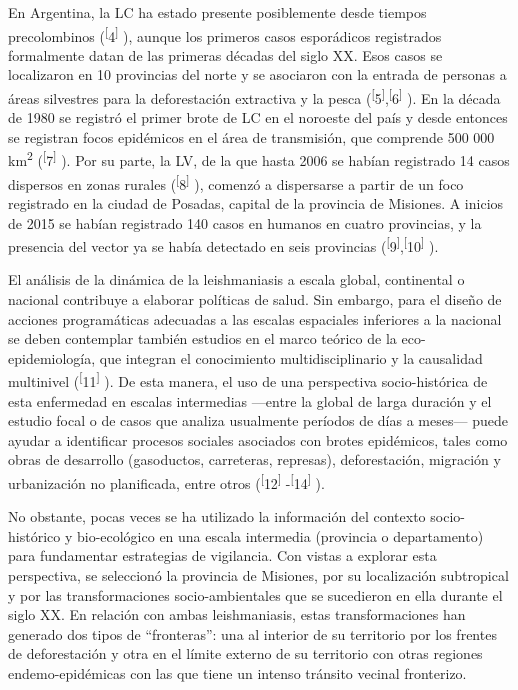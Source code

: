 \documentclass{article}
\begin{document}
En Argentina, la LC ha estado presente posiblemente desde tiempos precolombinos
(\textsuperscript{[}4\textsuperscript{]}
), aunque los primeros casos esporádicos registrados formalmente datan de las
primeras décadas del siglo XX. Esos casos se localizaron en 10 provincias del
norte y se asociaron con la entrada de personas a áreas silvestres para la
deforestación extractiva y la pesca (\textsuperscript{[}5\textsuperscript{]},\textsuperscript{[}6\textsuperscript{]}
). En la década de 1980 se registró el primer brote de LC en el noroeste del
país y desde entonces se registran focos epidémicos en el área de transmisión,
que comprende 500 000 km\textsuperscript{2}
(\textsuperscript{[}7\textsuperscript{]}
). Por su parte, la LV, de la que hasta 2006 se habían registrado 14 casos
dispersos en zonas rurales (\textsuperscript{[}8\textsuperscript{]}
), comenzó a dispersarse a partir de un foco registrado en la ciudad de Posadas,
capital de la provincia de Misiones. A inicios de 2015 se habían registrado 140
casos en humanos en cuatro provincias, y la presencia del vector ya se había
detectado en seis provincias (\textsuperscript{[}9\textsuperscript{]},\textsuperscript{[}10\textsuperscript{]}
).

El análisis de la dinámica de la leishmaniasis a escala global, continental o
nacional contribuye a elaborar políticas de salud. Sin embargo, para el diseño
de acciones programáticas adecuadas a las escalas espaciales inferiores a la
nacional se deben contemplar también estudios en el marco teórico de la
eco-epidemiología, que integran el conocimiento multidisciplinario y la
causalidad multinivel (\textsuperscript{[}11\textsuperscript{]}
). De esta manera, el uso de una perspectiva socio-histórica de esta enfermedad
en escalas intermedias —entre la global de larga duración y el estudio focal o
de casos que analiza usualmente períodos de días a meses— puede ayudar a
identificar procesos sociales asociados con brotes epidémicos, tales como obras
de desarrollo (gasoductos, carreteras, represas), deforestación, migración y
urbanización no planificada, entre otros
(\textsuperscript{[}12\textsuperscript{]}
-\textsuperscript{[}14\textsuperscript{]}
).

No obstante, pocas veces se ha utilizado la información del contexto
socio-histórico y bio-ecológico en una escala intermedia (provincia o
departamento) para fundamentar estrategias de vigilancia. Con vistas a explorar
esta perspectiva, se seleccionó la provincia de Misiones, por su localización
subtropical y por las transformaciones socio-ambientales que se sucedieron en
ella durante el siglo XX. En relación con ambas leishmaniasis, estas
transformaciones han generado dos tipos de “fronteras”: una al interior de su
territorio por los frentes de deforestación y otra en el límite externo de su
territorio con otras regiones endemo-epidémicas con las que tiene un intenso
tránsito vecinal fronterizo.
\end{document}
